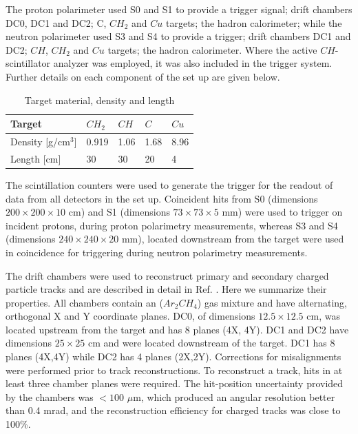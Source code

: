 \documentclass[twocolumn,epjc3]{svjour3}
\begin{document}
The proton polarimeter used S0 and S1 to provide a trigger signal; drift chambers DC0, DC1 and DC2; C, $CH_2$ and $Cu$ targets; the hadron calorimeter; while the neutron polarimeter used S3 and S4 to provide a trigger; drift chambers DC1 and DC2; $CH$, $CH_2$ and $Cu$ targets; the hadron calorimeter. Where the active $ CH$-scintillator analyzer was employed, it was also included in the trigger system. Further details on each component of the set up are given below.

\begin{table}
  \caption{Target material, density and length}
  \label{Table:targets}
  \begin{center}
    \begin{tabular*}{\columnwidth}{@{\extracolsep{\fill}} lllll @{}}
      \hline
      Target             & $CH_2$ & $CH$ & $C$  & $Cu$ \\
      \hline
      Density [g/cm$^3$] & 0.919  & 1.06 & 1.68 & 8.96 \\
      Length [cm]        & 30     & 30   & 20   & 4    \\
      \hline
    \end{tabular*}
  \end{center}
\end{table}

The scintillation counters were used to generate the trigger for the readout of data from all detectors in the set up. Coincident hits from S0 (dimensions $200\times 200 \times 10$ cm) and S1 (dimensions $73 \times 73 \times 5$ mm) were used to trigger on incident protons, during proton polarimetry measurements, whereas S3 and S4 (dimensions $240\times 240\times 20$ mm), located downstream from the target were used in coincidence for triggering during neutron polarimetry measurements.

The drift chambers were used to reconstruct primary and secondary charged particle tracks and are described in detail in Ref. \cite{Strela:2013}. Here we summarize their properties. All chambers contain an ($Ar_2CH_4$) gas mixture and have alternating, orthogonal X and Y coordinate planes. DC0, of dimensions $12.5\times12.5$ cm, was located upstream from the target and has 8 planes (4X, 4Y). DC1 and DC2 have dimensions $25\times 25$ cm and were located downstream of the target. DC1 has 8 planes (4X,4Y) while DC2 has 4 planes (2X,2Y).  Corrections for misalignments were performed prior to track reconstructions. To reconstruct a track, hits in at least three chamber planes were required. The hit-position uncertainty provided by the chambers was $<100$ $\mu$m, which produced an angular resolution better than 0.4 mrad, and the reconstruction efficiency for charged tracks was close to 100\%.
\end{document}
